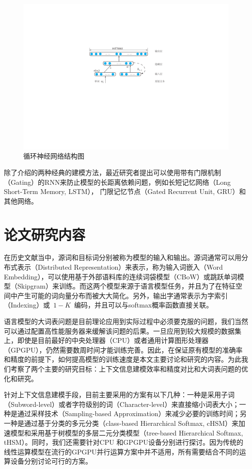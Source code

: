 \begin{figure}
  \centering
  \includegraphics[width=.8\linewidth]{./figures/rnnlm.pdf}
  \caption{循环神经网络结构图}\label{fig:rnnlm}
\end{figure}


除了介绍的两种经典的建模方法，最近研究者提出可以使用带有门限机制（Gating）的RNN来防止模型的长距离依赖问题，例如长短记忆网络（Long Short-Term Memory, LSTM）， 门限记忆节点（Gated Recurrent Unit, GRU）和其他网络。


\section{论文研究内容}
在历史文献当中，源词和目标词分别被称为模型的输入和输出。源词通常可以用分布式表示（Distributed Representation）来表示，称为输入词嵌入（Word Embedding），可以使用基于外部语料库的连续词袋模型（CBoW）或跳跃单词模型（Skipgram）来训练。而这两个模型来源于语言模型任务，并且为了在特征空间中产生可能的词向量分布而被大大简化。另外，输出字通常表示为字索引（Indexing）或~$1-K$~编码，并且可以与softmax概率函数直接关联。

语言模型的大词表问题是目前理论应用到实际过程中必须要克服的问题，我们当然可以通过配置高性能服务器来缓解该问题的后果。一旦应用到较大规模的数据集上，即使是目前最好的中央处理器（CPU）或者通用计算图形处理器（GPGPU），仍然需要数周时间才能训练完善。因此，在保证原有模型的准确率和精度的前提下，如何提高模型的训练速度是本文主要讨论和研究的内容。为此我们考察了两个主要的研究目标：上下文信息建模效率和精度对比和大词表问题的优化和研究。

针对上下文信息建模手段，目前主要采用的方案有以下几种：一种是采用子词（Subword-level）或者字符级别的词（Character-level）来直接缩小词表大小；一种是通过采样技术（Sampling-based Approximation）来减少必要的训练时间；另一种是通过基于分类的多元分类（class-based Hierarchical Softmax, cHSM）来加速模型和采用基于树模型的多层二元分类模型（tree-based Hierarchical Softmax, tHSM）。同时，我们还需要针对CPU 和GPGPU设备分别进行探讨。因为传统的线性运算模型在流行的GPGPU并行运算方案中并不适用，所有需要结合不同的运算设备分别讨论可行的方案。

